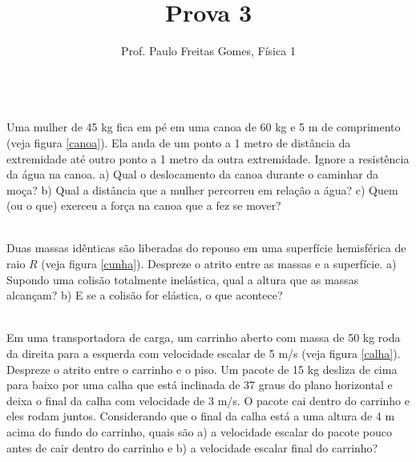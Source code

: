 \documentclass[12pt]{article}
\newenvironment{problem}[2][{\color{red}Problema}]{\begin{trivlist}
\item[\hskip \labelsep {\bfseries #1}\hskip \labelsep {\bfseries #2.}]}{\end{trivlist}}
\begin{document}
 
\title{{\color{blue}Prova 3}}
\author{Prof. Paulo Freitas Gomes, Física 1}
 
\maketitle
 
\begin{problem}{{\color{red}1}}
\\
Uma mulher de 45 kg fica em pé em uma canoa de 60 kg e 5 m de comprimento (veja figura \ref{canoa}). Ela anda de um ponto a 1 metro de distância da extremidade até outro ponto a 1 metro da outra extremidade. Ignore a resistência da água na canoa. a) Qual o deslocamento da canoa durante o caminhar da moça? b) Qual a distância que a mulher percorreu em relação a água? c) Quem (ou o que) exerceu a força na canoa que a fez se mover?
\end{problem}

\begin{problem}{{\color{red}2}}
\\
Duas massas idênticas são liberadas do repouso em uma superfície hemisférica de raio $R$ (veja figura \ref{cunha}). Despreze o atrito entre as massas e a superfície. a) Supondo uma colisão totalmente inelástica, qual a altura que as massas alcançam? b) E se a colisão for elástica, o que acontece?
\end{problem}


\begin{problem}{{\color{red}3}}
\\
Em uma transportadora de carga, um carrinho aberto com massa de 50 kg roda da direita para a esquerda com velocidade escalar de 5 m/s (veja figura \ref{calha}). Despreze o atrito entre o carrinho e o piso. Um pacote de 15 kg desliza de cima para baixo por uma calha que está inclinada de 37 graus do plano horizontal e deixa o final da calha com velocidade de 3 m/s. O pacote cai dentro do carrinho e eles rodam juntos. Considerando que o final da calha está a uma altura de 4 m acima do fundo do carrinho, quais são a) a velocidade escalar do pacote pouco antes de cair dentro do carrinho e b) a velocidade escalar final do carrinho?
\end{problem}
\end{document}
